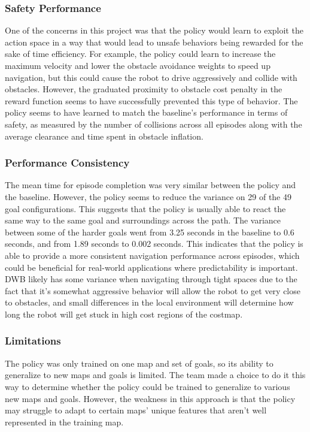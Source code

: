 \documentclass[conference]{IEEEtran}
\begin{document}
        \subsubsection{Safety Performance}
        One of the concerns in this project was that the policy would learn to exploit the action space in a way that would lead to unsafe behaviors being rewarded for the sake of time efficiency. For example, the policy could learn to increase the maximum velocity and lower the obstacle avoidance weights to speed up navigation, but this could cause the robot to drive aggressively and collide with obstacles. However, the graduated proximity to obstacle cost penalty in the reward function seems to have successfully prevented this type of behavior. The policy seems to have learned to match the baseline's performance in terms of safety, as measured by the number of collisions across all episodes along with the average clearance and time spent in obstacle inflation.

        \subsubsection{Performance Consistency}
        The mean time for episode completion was very similar between the policy and the baseline. However, the policy seems to reduce the variance on 29 of the 49 goal configurations. This suggests that the policy is usually able to react the same way to the same goal and surroundings across the path. The variance between some of the harder goals went from 3.25 seconds in the baseline to 0.6 seconds, and from 1.89 seconds to 0.002 seconds. This indicates that the policy is able to provide a more consistent navigation performance across episodes, which could be beneficial for real-world applications where predictability is important. DWB likely has some variance when navigating through tight spaces due to the fact that it's somewhat aggressive behavior will allow the robot to get very close to obstacles, and small differences in the local environment will determine how long the robot will get stuck in high cost regions of the costmap. 

        \subsubsection{Limitations}
        The policy was only trained on one map and set of goals, so its ability to generalize to new maps and goals is limited. The team made a choice to do it this way to determine whether the policy could be trained to generalize to various new maps and goals. However, the weakness in this approach is that the policy may struggle to adapt to certain maps' unique features that aren't well represented in the training map.
\end{document}
